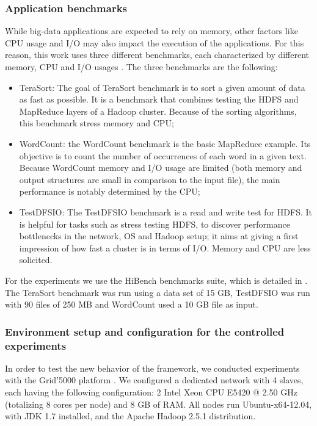 \subsubsection{Application benchmarks}

While big-data applications are expected to rely on memory, other factors like CPU usage and I/O may also impact the execution of the applications. For this reason, this work uses three different benchmarks, each characterized by different memory, CPU and I/O usages \cite{Benchmarks}. The three benchmarks are the following:
\begin{itemize}
	\item TeraSort: The goal of TeraSort benchmark \cite{TeraSort2008} is to sort a given amount of data as fast as possible. It is a benchmark that combines testing the HDFS and MapReduce layers of a Hadoop cluster. Because of the sorting algorithms, this benchmark stress memory and CPU;
	\item WordCount: the WordCount benchmark is the basic MapReduce example. Its objective is to count the number of occurrences of each word in a given text. Because WordCount memory and I/O usage are limited (both memory and output structures are small in comparison to the input file), the main performance is notably determined by the CPU;  
	\item TestDFSIO: The TestDFSIO benchmark is a read and write test for HDFS. It is helpful for tasks such as stress testing HDFS, to discover performance bottlenecks in the network, OS and Hadoop setup; it aims at giving a first impression of how fast a cluster is in terms of I/O. Memory and CPU are less solicited.
\end{itemize}

For the experiments we use the HiBench benchmarks suite, which is detailed in \cite{HiBench}. The TeraSort benchmark was run using a data set of 15 GB, TestDFSIO was run with 90 files of 250 MB and WordCount used a 10 GB file as input. 

\subsubsection{Environment setup and configuration for the controlled experiments\label{sec:5.3}} 
  
In order to test the new behavior of the framework, we conducted experiments with the Grid'5000 platform \cite{g5k}. We configured a dedicated network with 4 slaves, each having the following configuration: 2 Intel Xeon CPU E5420 @ 2.50 GHz (totalizing 8 cores per node) and 8 GB of RAM. All nodes run Ubuntu-x64-12.04, with JDK 1.7 installed, and the Apache Hadoop 2.5.1 distribution.

